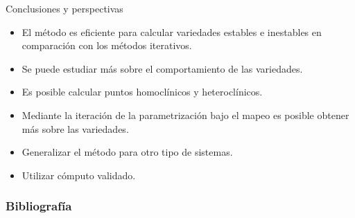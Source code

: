 \documentclass[11pt]{beamer}
\theoremstyle{definition}
\begin{document}
\begin{frame}{Conclusiones y perspectivas}
\justifying
\begin{itemize}
    \item El método es eficiente para calcular variedades estables e inestables en comparación con los métodos iterativos.
    \item Se puede estudiar más sobre el comportamiento de las variedades.
    \item Es posible calcular puntos homoclínicos y heteroclínicos.
    \item Mediante la iteración de la parametrización bajo el mapeo es posible obtener más sobre las variedades.
    \item Generalizar el método para otro tipo de sistemas.
    \item Utilizar cómputo validado.
\end{itemize}


\end{frame}

\begin{frame}[allowframebreaks]
  \frametitle{Bibliografía}
  
  \nocite{Mireles, Mireles2,Haro,Meyer, gerald,Meiss, Chang, Merlo,Juergen, Tomoki, Jung,Jung2, Seligman, Ott,gold, arnold,arn,hale, ver, devaney,devaney2,marion, ramon, interval,validated, static,root,Friedberg, Mateo,book:Calvin,Numerics,Ying}
  
  
  
\end{frame}
\end{document}
